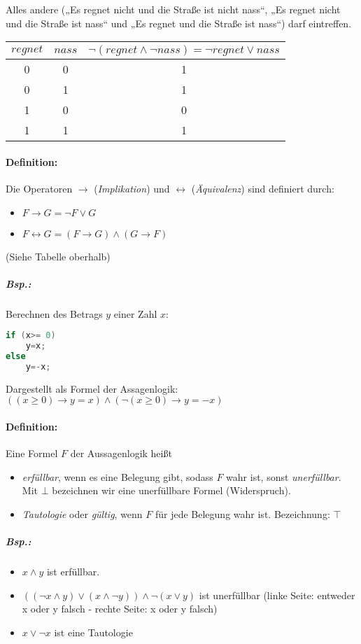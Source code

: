 Alles andere („Es regnet nicht und die Straße ist nicht nass“, „Es regnet nicht und die Straße ist nass“ und „Es regnet und die Straße ist nass“) darf eintreffen.\\
\begin{tabular}{c c | c}
$regnet$ & $nass$ & $\neg (regnet \wedge \neg nass) = \neg regnet \vee nass$\\
\hline
0&0&1\\
0&1&1\\
1&0&0\\
1&1&1\\
\end{tabular}

\paragraph{Definition:} Die Operatoren $\rightarrow$ (\emph{Implikation}) und $\leftrightarrow$ (\emph{Äquivalenz}) sind definiert durch:
\begin{itemize}
\item $F\rightarrow G = \neg F \vee G$
\item $F\leftrightarrow G = (F \rightarrow G) \wedge (G \rightarrow F)$
\end{itemize}
(Siehe Tabelle oberhalb)

\subparagraph{Bsp.:} Berechnen des Betrags $y$ einer Zahl $x$:
\begin{lstlisting}[language=C]
if (x>= 0)
	y=x;
else 
	y=-x;
\end{lstlisting}
Dargestellt als Formel der Assagenlogik: $((x\geq 0) \rightarrow y=x)\wedge(\neg (x\geq 0) \rightarrow y=-x)$

\paragraph{Definition:} Eine Formel $F$ der Aussagenlogik heißt
\begin{itemize}

\item \emph{erfüllbar}, wenn es eine Belegung gibt, sodass $F$ wahr ist, sonst \emph{unerfüllbar}. Mit $\bot$ bezeichnen wir eine unerfüllbare Formel (Widerspruch).
\item \emph{Tautologie} oder \emph{gültig}, wenn $F$ für jede Belegung wahr ist. Bezeichnung: $\top$
\end{itemize}

\subparagraph{Bsp.:}
\begin{itemize}
\item $x\wedge y$ ist erfüllbar.
\item $((\neg x \wedge y)\vee (x\wedge \neg y)) \wedge \neg (x\vee y)$ ist unerfüllbar (linke Seite: entweder x oder y falsch - rechte Seite: x oder y falsch)
\item $x \vee \neg x$ ist eine Tautologie
\end{itemize}

